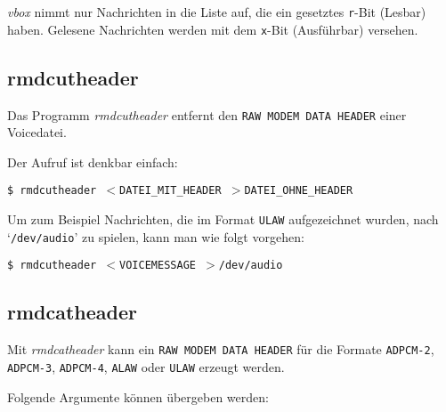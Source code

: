 {\em vbox\/} nimmt nur Nachrichten in die Liste auf, die ein gesetztes
{\tt r}-Bit (Lesbar) haben. Gelesene Nachrichten werden mit dem
{\tt x}-Bit (Ausf\"{u}hrbar) versehen.






\subsection{rmdcutheader\label{id-rmdcutheader}}



Das Programm {\em rmdcutheader\/} entfernt den {\tt RAW MODEM DATA
HEADER} einer Voicedatei.

Der Aufruf ist denkbar einfach:

{\tt \$ rmdcutheader {\(<\)}DATEI\_MIT\_HEADER {\(>\)}DATEI\_OHNE\_HEADER}

Um zum Beispiel Nachrichten, die im Format {\tt ULAW} aufgezeichnet
wurden, nach `{\tt /dev/audio}' zu spielen, kann man wie folgt vorgehen:

{\tt \$ rmdcutheader {\(<\)}VOICEMESSAGE {\(>\)}/dev/audio}






\subsection{rmdcatheader\label{id-rmdcatheader}}



Mit {\em rmdcatheader\/} kann ein {\tt RAW MODEM DATA HEADER} f\"{u}r die
Formate {\tt ADPCM-2}, {\tt ADPCM-3}, {\tt ADPCM-4}, {\tt ALAW}
oder {\tt ULAW} erzeugt werden.

Folgende Argumente k\"{o}nnen \"{u}bergeben werden:

